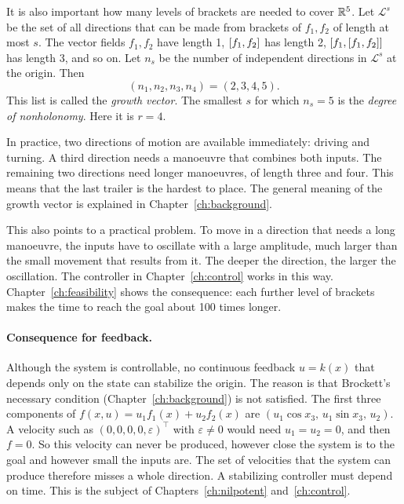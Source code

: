 It is also important how many levels of brackets are needed to cover $\mathbb{R}^5$. Let
$\mathcal L^s$ be the set of all directions that can be made from brackets of
$f_1,f_2$ of length at most $s$. The vector fields $f_1,f_2$ have length 1,
$[f_1,f_2]$ has length 2, $[f_1,[f_1,f_2]]$ has
length 3, and so on. Let $n_s$ be the number of independent directions in
$\mathcal L^s$ at the origin. Then
\begin{equation}
  (n_1,n_2,n_3,n_4)=(2,3,4,5).
  \label{eq:growth}
\end{equation}
This list is called the \emph{growth vector}. The smallest $s$ for which $n_s=5$
is the \emph{degree of nonholonomy}. Here it is $r=4$.

In practice, two directions of motion are available immediately: driving and
turning. A third direction needs a manoeuvre that combines both inputs. The
remaining two directions need longer manoeuvres, of length three and four. This
means that the last trailer is the hardest to place. The general meaning of the
growth vector is explained in Chapter~\ref{ch:background}.

This also points to a practical problem. To move in a direction that needs a
long manoeuvre, the inputs have to oscillate with a large amplitude, much larger
than the small movement that results from it. The deeper the direction, the
larger the oscillation. The controller in Chapter~\ref{ch:control} works in this
way. Chapter~\ref{ch:feasibility} shows the consequence: each further level of
brackets makes the time to reach the goal about 100 times longer.

\paragraph{Consequence for feedback.}
Although the system is controllable, no continuous feedback $u=k(x)$ that depends
only on the state can stabilize the origin. The reason is that Brockett's
necessary condition \cite{brockett1983} (Chapter~\ref{ch:background}) is not
satisfied. The first three components of $f(x,u)=u_1f_1(x)+u_2f_2(x)$ are
$(u_1\cos x_3,\,u_1\sin x_3,\,u_2)$. A velocity such as
$(0,0,0,0,\varepsilon)^\top$ with $\varepsilon\neq0$ would need $u_1=u_2=0$, and
then $f=0$. So this velocity can never be produced, however close the system is
to the goal and however small the inputs are. The set of velocities that the
system can produce therefore misses a whole direction. A stabilizing controller
must depend on time. This is the subject of Chapters~\ref{ch:nilpotent}
and~\ref{ch:control}.

